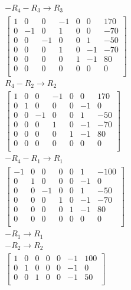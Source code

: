 \documentclass[12pt letter openany]{report}
\begin{document}
\begin{align*}
  -R_4 - R_3  \rightarrow R_3     \\
  \begin{bmatrix}
    1 & 0  & 0  & -1 & 0 & 0  & 170 \\
    0 & -1 & 0  & 1  & 0 & 0  & -70 \\
    0 & 0  & -1 & 0  & 0 & 1  & -50 \\
    0 & 0  & 0  & 1  & 0 & -1 & -70 \\
    0 & 0  & 0  & 0  & 1 & -1 & 80  \\
    0 & 0  & 0  & 0  & 0 & 0  & 0   \\
  \end{bmatrix}
  \\
  R_4 - R_2  \rightarrow R_2      \\
  \begin{bmatrix}
    1 & 0 & 0  & -1 & 0 & 0  & 170 \\
    0 & 1 & 0  & 0  & 0 & -1 & 0   \\
    0 & 0 & -1 & 0  & 0 & 1  & -50 \\
    0 & 0 & 0  & 1  & 0 & -1 & -70 \\
    0 & 0 & 0  & 0  & 1 & -1 & 80  \\
    0 & 0 & 0  & 0  & 0 & 0  & 0   \\
  \end{bmatrix}
  \\
  -R_4 - R_1  \rightarrow R_1     \\
  \begin{bmatrix}
    -1 & 0 & 0  & 0 & 0 & 1  & -100 \\
    0  & 1 & 0  & 0 & 0 & -1 & 0    \\
    0  & 0 & -1 & 0 & 0 & 1  & -50  \\
    0  & 0 & 0  & 1 & 0 & -1 & -70  \\
    0  & 0 & 0  & 0 & 1 & -1 & 80   \\
    0  & 0 & 0  & 0 & 0 & 0  & 0    \\
  \end{bmatrix} \\
  -R_1 \to R_1                    \\
  -R_2 \to R_2                    \\
  \begin{bmatrix}
    1 & 0 & 0 & 0 & 0 & -1 & 100 \\
    0 & 1 & 0 & 0 & 0 & -1 & 0   \\
    0 & 0 & 1 & 0 & 0 & -1 & 50  \\

\end{bmatrix}
\end{align*}
\end{document}
